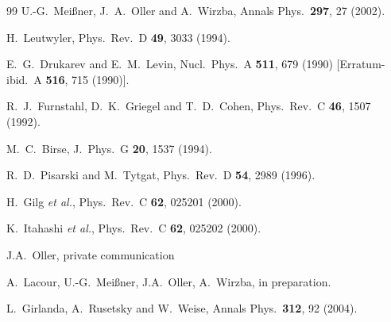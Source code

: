 \documentclass[aps,rmp,nofootinbib,twocolumn,floatfix]{revtex4}
\begin{document}
\begin{thebibliography}{99}
  U.-G.~Mei{\ss}ner, J.~A.~Oller and A.~Wirzba, 
  Annals Phys.\  {\bf 297}, 27 (2002).

  H.~Leutwyler,
  Phys.\ Rev.\  D {\bf 49}, 3033 (1994).


  E.~G.~Drukarev and E.~M.~Levin,
  Nucl.\ Phys.\  A {\bf 511}, 679 (1990)
  [Erratum-ibid.\  A {\bf 516}, 715 (1990)].

  R.~J.~Furnstahl, D.~K.~Griegel and T.~D.~Cohen,
  Phys.\ Rev.\  C {\bf 46}, 1507 (1992).

  M.~C.~Birse,
  J.\ Phys.\ G {\bf 20}, 1537 (1994).

  R.~D.~Pisarski and M.~Tytgat,
  Phys.\ Rev.\  D {\bf 54}, 2989 (1996).

  H.~Gilg {\it et al.},
  Phys.\ Rev.\  C {\bf 62}, 025201 (2000).

  K.~Itahashi {\it et al.},
  Phys.\ Rev.\  C {\bf 62}, 025202 (2000).

 J.A.~Oller, private communication

 A.~Lacour, U.-G.~Mei{\ss}ner, J.A.~Oller, A.~Wirzba,
in preparation.

  L.~Girlanda, A.~Rusetsky and W.~Weise, 
  Annals Phys.\  {\bf 312}, 92 (2004).


\end{thebibliography}
\end{document}
